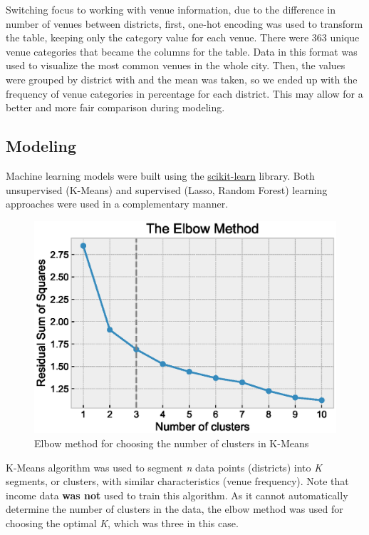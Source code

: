 \documentclass[12pt]{article}
\begin{document}
Switching focus to working with venue information, due to the difference in
number of venues between districts, first, one-hot encoding was used to
transform the table, keeping only the category value for each venue. There were
363 unique venue categories that became the columns for the table. Data in this
format was used to visualize the most common venues in the whole city. Then, the
values were grouped by district with and the mean was taken, so we ended up with
the frequency of venue categories in percentage for each district. This may
allow for a better and more fair comparison during modeling.

\subsection{Modeling}

Machine learning models were built using the
\href{https://scikit-learn.org/stable/index.html}{scikit-learn} library. Both
unsupervised (K-Means) and supervised (Lasso, Random Forest) learning approaches
were used in a complementary manner.

\begin{figure} \centering
        \includegraphics[width=\linewidth]{plot_elbow.eps}
        \caption{Elbow method for choosing the number of clusters in
        K-Means\label{fig:plot_elbow}}
\end{figure}

K-Means algorithm was used to segment \emph{n} data points (districts) into
\emph{K} segments, or clusters, with similar characteristics (venue frequency).
Note that income data \textbf{was not} used to train this algorithm. As it
cannot automatically determine the number of clusters in the data, the elbow
method was used for choosing the optimal \emph{K}, which was three in this
case.
\end{document}
